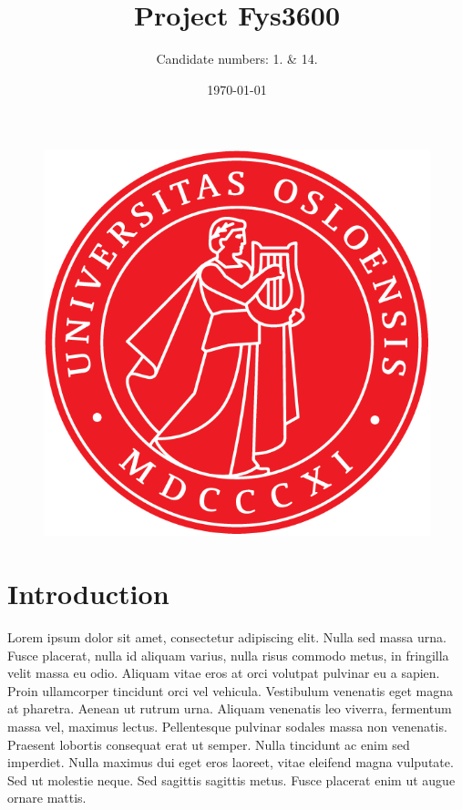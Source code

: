 \documentclass[norsk,a4paper,12pt]{article}
\title{Project Fys3600}
\author{Candidate numbers: 1. \& 14.}
\date{\today}
\begin{document}
\maketitle

\begin{figure}[H]
\begin{center}
\includegraphics[scale=1.0]{uiosegl.png}
\end{center}
\end{figure}



\newpage

\tableofcontents

\section{Introduction} %
\label{sec:intro}


Lorem ipsum dolor sit amet, consectetur adipiscing elit. Nulla sed massa urna. Fusce placerat, nulla id aliquam varius, nulla risus commodo metus, in fringilla velit massa eu odio. Aliquam vitae eros at orci volutpat pulvinar eu a sapien. Proin ullamcorper tincidunt orci vel vehicula. Vestibulum venenatis eget magna at pharetra. Aenean ut rutrum urna. Aliquam venenatis leo viverra, fermentum massa vel, maximus lectus. Pellentesque pulvinar sodales massa non venenatis. Praesent lobortis consequat erat ut semper. Nulla tincidunt ac enim sed imperdiet. Nulla maximus dui eget eros laoreet, vitae eleifend magna vulputate. Sed ut molestie neque. Sed sagittis sagittis metus. Fusce placerat enim ut augue ornare mattis.
\end{document}
